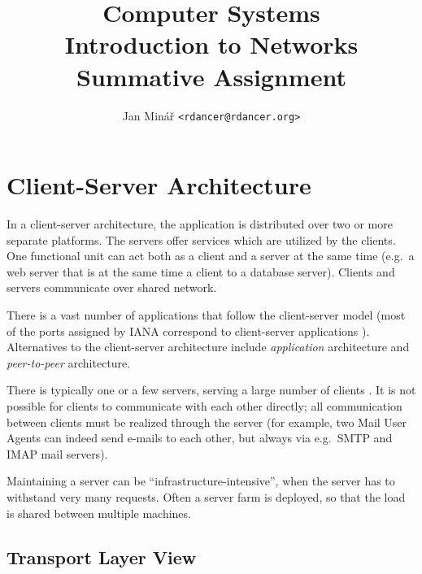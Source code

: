 \documentclass[10pt]{report}
\author{Jan Minář {\tt <rdancer@rdancer.org>}}
\title{Computer Systems\\Introduction to Networks\\Summative Assignment}
\begin{document}


\maketitle




\chapter{Client-Server Architecture}
\thispagestyle{fancy}

In a client-server architecture, the application is distributed over two or
more separate platforms.  The servers offer services which are utilized by the
clients.  One functional unit can act both as a client and a server at the same time
(e.g.\ a web server that is at the same time a client to a database server).
Clients and servers communicate over shared network. \cite[pp3--11]{vaughn}

There is a vast number of applications that follow the client-server model
(most of the ports assigned by IANA correspond to client-server applications
\cite{iana}).  Alternatives to the client-server architecture include
{\em application} architecture and {\em peer-to-peer} architecture.  \cite[p110]{kurose}

There is typically one or a few servers, serving a large number of clients
\cite[p110]{kurose}.  It is not possible for clients to communicate
with each other directly; all communication between clients must be
realized through the server (for example, two Mail User Agents 
can indeed send e-mails to each other, but always via e.g.\ SMTP and IMAP mail servers).

Maintaining a server can be ``infrastructure-intensive'', when the server has
to withstand very many requests.  Often a server farm is deployed, so that the
load is shared between multiple machines.  \cite[p110]{kurose}

\section{Transport Layer View}
\end{document}
